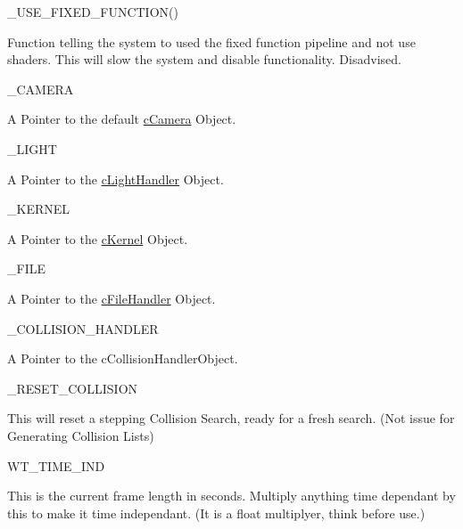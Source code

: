 \begin{DoxyItemize}
\item \_\-USE\_\-FIXED\_\-FUNCTION()
\begin{DoxyItemize}
\item Function telling the system to used the fixed function pipeline and not use shaders. This will slow the system and disable functionality. Disadvised.
\end{DoxyItemize}
\item \_\-CAMERA
\begin{DoxyItemize}
\item A Pointer to the default \hyperlink{classc_camera}{cCamera} Object.
\end{DoxyItemize}
\item \_\-LIGHT
\begin{DoxyItemize}
\item A Pointer to the \hyperlink{classc_light_handler}{cLightHandler} Object.
\end{DoxyItemize}
\item \_\-KERNEL
\begin{DoxyItemize}
\item A Pointer to the \hyperlink{classc_kernel}{cKernel} Object.
\end{DoxyItemize}
\item \_\-FILE
\begin{DoxyItemize}
\item A Pointer to the \hyperlink{classc_file_handler}{cFileHandler} Object.
\end{DoxyItemize}
\item \_\-COLLISION\_\-HANDLER
\begin{DoxyItemize}
\item A Pointer to the cCollisionHandlerObject.
\end{DoxyItemize}
\item \_\-RESET\_\-COLLISION
\begin{DoxyItemize}
\item This will reset a stepping Collision Search, ready for a fresh search. (Not issue for Generating Collision Lists)
\end{DoxyItemize}
\item WT\_\-TIME\_\-IND
\begin{DoxyItemize}
\item This is the current frame length in seconds. Multiply anything time dependant by this to make it time independant. (It is a float multiplyer, think before use.)\par


\end{DoxyItemize}
\end{DoxyItemize}
